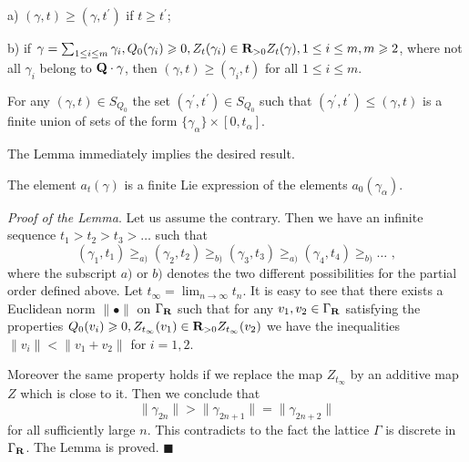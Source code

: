 \documentclass[12pt]{article}
\begin{document}
a) $(\gamma,t)\geqslant (\gamma,t^{\prime})$ if $t\geqslant t^{\prime}$;

b) if $\gamma=\sum_{1\le i\le m}\gamma_i, Q_0(\gamma_i)\geqslant 0, Z_t(\gamma_i)\in {\bf R}_{>0}Z_t(\gamma), 1\le i\le m, m\geqslant 2$, where not all $\gamma_i$ belong to
${\bf Q}\cdot\gamma$, then $(\gamma,t)\geqslant (\gamma_i,t)$ for all $1\le i\le m$.

\begin{lmm} For any $(\gamma,t)\in S_{Q_0}$ the set $(\gamma^{\prime},t^{\prime})\in S_{Q_0}$
such that $(\gamma^{\prime},t^{\prime})\le (\gamma,t)$ is a finite union of  sets of the form
$\{\gamma_{\alpha}\}\times [0,t_{\alpha}]$.

\end{lmm}

The Lemma immediately implies the desired result.

\begin{cor} The element $a_t({\gamma})$ is a finite Lie expression of the elements $a_{0}(\gamma_{\alpha})$.

\end{cor}

{\it Proof of the Lemma}. Let us assume the contrary. Then we have an infinite sequence $t_1>t_2>t_3>\dots$
such that 
$$(\gamma_1,t_1)\geqslant _{a)}(\gamma_2,t_2)\geqslant_{b)}(\gamma_3,t_3)\geqslant_{a)}(\gamma_4,t_4)\geqslant_{b)}\dots\,\,,$$
where the subscript $a)$ or $b)$ denotes the two different possibilities for the partial order defined above.
Let $t_{\infty}=\lim_{n\to \infty}t_n$. It is easy to see that there exists a Euclidean norm $\parallel\bullet\parallel$ on $\Gamma_{{\bf R}}$ such that for any $v_1,v_2\in \Gamma_{{\bf R}}$ satisfying the properties $Q_0(v_i)\geqslant 0, Z_{t_{\infty}}(v_1)\in {\bf R}_{>0}Z_{t_{\infty}}(v_2)$ we have the inequalities
$\parallel v_i\parallel <\parallel v_1+v_2\parallel$ for $i=1,2$.




Moreover the same property holds if we replace the map $Z_{t_{\infty}}$  by an additive map $Z$ which is close to it. Then we conclude that $$\parallel \gamma_{2n}\parallel>\parallel \gamma_{2n+1}\parallel=
\parallel \gamma_{2n+2}\parallel$$ for all sufficiently large $n$. This contradicts to the fact the lattice $\Gamma$ is discrete in $\Gamma_{{\bf R}}$. The Lemma is proved. $\blacksquare$
\end{document}
